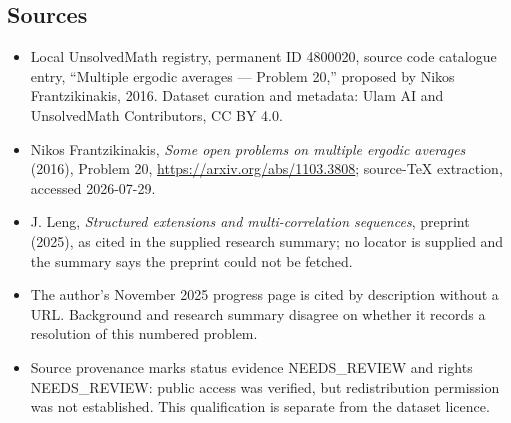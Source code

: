 \documentclass[11pt]{article}
\begin{document}
\subsection{Sources}
\begin{itemize}
\item Local UnsolvedMath registry, permanent ID 4800020, source code catalogue entry, ``Multiple ergodic averages --- Problem 20,'' proposed by Nikos Frantzikinakis, 2016. Dataset curation and metadata: Ulam AI and UnsolvedMath Contributors, CC BY 4.0.
\item Nikos Frantzikinakis, \emph{Some open problems on multiple ergodic averages} (2016), Problem 20, \url{https://arxiv.org/abs/1103.3808}; source-TeX extraction, accessed 2026-07-29.
\item J. Leng, \emph{Structured extensions and multi-correlation sequences}, preprint (2025), as cited in the supplied research summary; no locator is supplied and the summary says the preprint could not be fetched.
\item The author's November 2025 progress page is cited by description without a URL. Background and research summary disagree on whether it records a resolution of this numbered problem.
\item Source provenance marks status evidence NEEDS\_REVIEW and rights NEEDS\_REVIEW: public access was verified, but redistribution permission was not established. This qualification is separate from the dataset licence.
\end{itemize}
\end{document}
